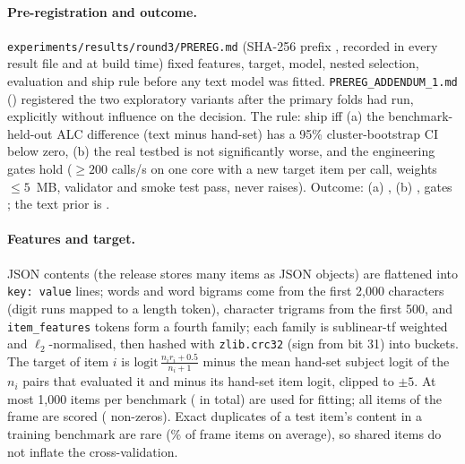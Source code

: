 \documentclass{article}
\begin{document}
\paragraph{Pre-registration and outcome.} \texttt{experiments/results/round3/PREREG.md} (SHA-256 prefix \texttt{\TpPreregSha}, recorded in every result file and \TpPreregConsistent{} at build time) fixed features, target, model, nested selection, evaluation and ship rule before any text model was fitted. \texttt{PREREG\_ADDENDUM\_1.md} (\TpAddendumConsistent) registered the two exploratory variants after the primary folds had run, explicitly without influence on the decision. The rule: ship iff (a) the benchmark-held-out ALC difference (text minus hand-set) has a 95\% cluster-bootstrap CI below zero, (b) the real testbed is not significantly worse, and the engineering gates hold ($\ge200$ calls/s on one core with a new target item per call, weights $\le5$~MB, validator and smoke test pass, never raises). Outcome: (a) \TpRuleA, (b) \TpRuleB, gates \TpGates; the text prior is \TpShip.

\paragraph{Features and target.} JSON contents (the release stores many items as JSON objects) are flattened into \texttt{key: value} lines; words and word bigrams come from the first 2,000 characters (digit runs mapped to a length token), character trigrams from the first 500, and \texttt{item\_features} tokens form a fourth family; each family is sublinear-tf weighted and $\ell_2$-normalised, then hashed with \texttt{zlib.crc32} (sign from bit 31) into \TpBits{} buckets. The target of item $i$ is $\mathrm{logit}\,\frac{n_ir_i+0.5}{n_i+1}$ minus the mean hand-set subject logit of the $n_i$ pairs that evaluated it and minus its hand-set item logit, clipped to $\pm5$. At most 1,000 items per benchmark (\TpNTargetItems{} in total) are used for fitting; all \TpNItems{} items of the frame are scored (\TpNnz{} non-zeros). Exact duplicates of a test item's content in a training benchmark are rare (\TpDupMean\% of frame items on average), so shared items do not inflate the cross-validation.
\end{document}
